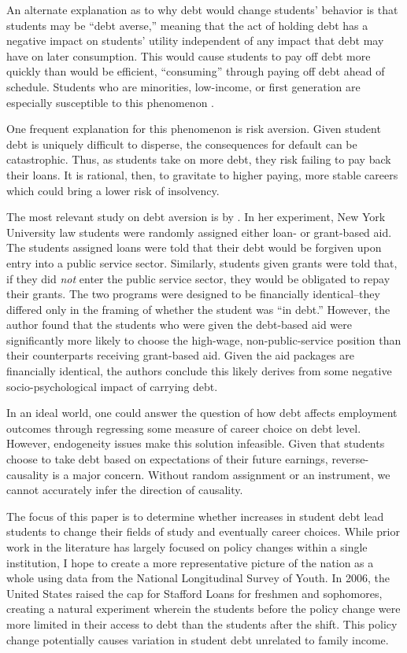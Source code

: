 \documentclass[12pt]{article}
\begin{document}
	An alternate explanation as to why debt would change students' behavior is that students may be ``debt averse,'' meaning that the act of holding debt has a negative impact on students' utility independent of any impact that debt may have on later consumption. This would cause students to pay off debt more quickly than would be efficient, ``consuming'' through paying off debt ahead of schedule. Students who are minorities, low-income, or first generation are especially susceptible to this phenomenon \parencite{burdman2005, field2009, callender2005}. 
	
	One frequent explanation for this phenomenon is risk aversion. Given student debt is uniquely difficult to disperse, the consequences for default can be catastrophic. Thus, as students take on more debt, they risk failing to pay back their loans. It is rational, then, to gravitate to higher paying, more stable careers which could bring a lower risk of insolvency. 
	
	The most relevant study on debt aversion is by \textcite{field2009}. In her experiment, New York University law students were randomly assigned either loan- or grant-based aid. The students assigned loans were told that their debt would be forgiven upon entry into a public service sector. Similarly, students given grants were told that, if they did \emph{not} enter the public service sector, they would be obligated to repay their grants. The two programs were designed to be financially identical--they differed only in the framing of whether the student was ``in debt.'' However, the author found that the students who were given the debt-based aid were significantly more likely to choose the high-wage, non-public-service position than their counterparts receiving grant-based aid. Given the aid packages are financially identical, the authors conclude this likely derives from some negative socio-psychological impact of carrying debt.
	
	In an ideal world, one could answer the question of how debt affects employment outcomes through regressing some measure of career choice on debt level. However, endogeneity issues make this solution infeasible. Given that students choose to take debt based on expectations of their future earnings, reverse-causality is a major concern. Without random assignment or an instrument, we cannot accurately infer the direction of causality. 
	
	The focus of this paper is to determine whether increases in student debt lead students to change their fields of study and eventually career choices. While prior work in the literature has largely focused on policy changes within a single institution, I hope to create a more representative picture of the nation as a whole using data from the National Longitudinal Survey of Youth. In 2006, the United States raised the cap for Stafford Loans for freshmen and sophomores, creating a natural experiment wherein the students before the policy change were more limited in their access to debt than the students after the shift. This policy change potentially causes variation in student debt unrelated to family income. 
	
\end{document}
